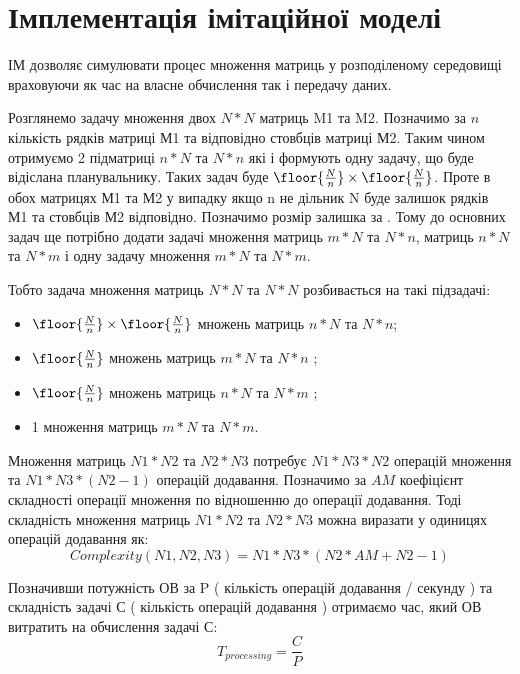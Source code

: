 
\section{Імплементація імітаційної моделі}

ІМ дозволяє симулювати процес множення матриць у розподіленому середовищі враховуючи як час на власне обчислення так і передачу даних.

Розглянемо задачу множення двох $N*N$ матриць M1 та M2. Позначимо за $n$ кількість рядків матриці М1 та відповідно стовбців матриці М2. Таким чином отримуємо 2 підматриці $n*N$ та $N*n$ які і формують одну задачу, що буде відіслана планувальнику. Таких задач буде $ \floor{ \frac{N}{n} } \times \floor{ \frac{N}{n} } $. Проте в обох матрицях М1 та М2 у випадку якщо n не дільник N буде залишок рядків М1 та стовбців М2 відповідно. Позначимо розмір залишка за  . Тому до основних задач ще потрібно додати задачі множення матриць $m*N$ та $N*n$, матриць $n*N$ та $N*m$ і одну задачу множення  $m*N$ та $N*m$.

Тобто задача множення матриць $N*N$ та $N*N$ розбивається на такі підзадачі:
\begin{itemize}
	\item $ \floor{ \frac{N}{n} } \times \floor{ \frac{N}{n} } $ множень матриць $n*N$ та $N*n$;
	\item $ \floor{ \frac{N}{n} } $ множень матриць $m*N$ та $N*n$ ;
	\item $ \floor{ \frac{N}{n} } $ множень матриць $n*N$ та $N*m$ ;
	\item 1 множення матриць $m*N$ та $N*m$.
\end{itemize}

Множення матриць $N1*N2$ та $N2*N3$ потребує $N1*N3*N2$ операцій множення та $N1*N3*(N2-1)$ операцій додавання. Позначимо за $AM$ коефіцієнт складності операції множення по відношенню до операції додавання. Тоді складність множення матриць $N1*N2$ та $N2*N3$ можна виразати у одиницях операцій додавання як:
\begin{equation}
\label{eq:complexity_fmla}
Complexity(N1,N2,N3) = N1*N3*( N2 *AM + N2 - 1)
\end{equation}

Позначивши потужність ОВ за P ( кількість операцій додавання / секунду ) та складність задачі С ( кількість операцій додавання ) отримаємо час, який ОВ витратить на обчислення задачі С:
\begin{equation}
\label{eq:processing_time_simple}
T_{processing} = \frac{C}{P}
\end{equation}

